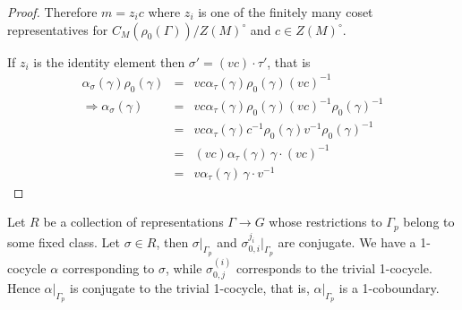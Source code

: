 \begin{proof}
	Therefore $m = z_ic$ where $z_i$ is one of the finitely many coset representatives for $C_M(\rho_0(\Gamma))/Z(M)^\circ$ and $c\in Z(M)^\circ$.
	
	If $z_i$ is the identity element then $\sigma' = (vc)\cdot\tau'$, that is
	\begin{eqnarray*}
		\alpha_\sigma(\gamma)\rho_0(\gamma) &=& vc\alpha_\tau(\gamma)\rho_0(\gamma)(vc)^{-1} \\
		\Rightarrow \alpha_\sigma(\gamma) &=& vc\alpha_\tau(\gamma)\rho_0(\gamma)(vc)^{-1}\rho_0(\gamma)^{-1} \\
		&=& vc\alpha_\tau(\gamma)c^{-1}\rho_0(\gamma)v^{-1}\rho_0(\gamma)^{-1} \\
		&=& (vc)\alpha_\tau(\gamma)\, \gamma\cdot(vc)^{-1} \\
		&=& v\alpha_\tau(\gamma)\, \gamma\cdot v^{-1}
	\end{eqnarray*}
		
\end{proof}



Let $R$ be a collection of representations $\Gamma \rightarrow G$ whose restrictions to $\Gamma_p$ belong to some fixed class. Let $\sigma\in R$, then $\sigma|_{\Gamma_p}$ and $\sigma^{j_i}_{0,i}|_{\Gamma_p}$ are conjugate. We have a 1-cocycle $\alpha$ corresponding to $\sigma$, while $\sigma_{0,j}^{(i)}$ corresponds to the trivial 1-cocycle. Hence $\alpha|_{\Gamma_p}$ is conjugate to the trivial 1-cocycle, that is, $\alpha|_{\Gamma_p}$ is a 1-coboundary. 

% 
% 
% 
% 



